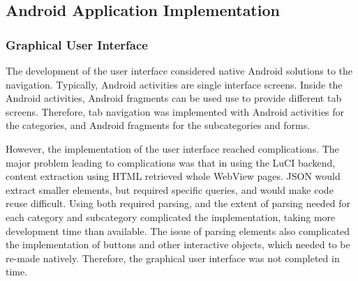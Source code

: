 \subsection{Android Application Implementation}

\subsubsection{Graphical User Interface}
The development of the user interface considered native Android solutions to the navigation. Typically, Android activities are single interface screens. Inside the Android activities, Android fragments can be used use to provide different tab screens. Therefore, tab navigation was implemented with Android activities for the categories, and Android fragments for the subcategories and forms.

However, the implementation of the user interface reached complications. The major problem leading to complications was that in using the LuCI backend, content extraction using HTML retrieved whole WebView pages. JSON would extract smaller elements, but required specific queries, and would make code reuse difficult. Using both required parsing, and the extent of parsing needed for each category and subcategory complicated the implementation, taking more development time than available. The issue of parsing elements also complicated the implementation of buttons and other interactive objects, which needed to be re-made natively. Therefore, the graphical user interface was not completed in time.
